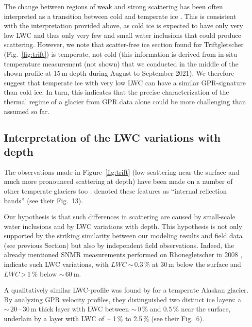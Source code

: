 The change between regions of weak and strong scattering has been often interpreted as a transition between cold and temperate ice \citep[e.g.][]{Moore&al1999,Blatter&Hutter1991,Bjornsson&el1996}. This is consistent with the interpretation provided above, as cold ice is expected to have only very low LWC and thus only very few and small water inclusions that could produce scattering. However, we note that scatter-free ice section found for Triftgletscher (Fig.~\ref{fig:trift}) is temperate, not cold (this information is derived from in-situ temperature measurement (not shown) that we conducted in the middle of the shown profile at 15\,m depth during August to September 2021). We therefore suggest that temperate ice with very low LWC can have a similar GPR-signature than cold ice. In turn, this indicates that the precise characterization of the thermal regime of a glacier from GPR data alone could be more challenging than assumed so far.  

\subsection{Interpretation of the LWC variations with depth}

The observations made in Figure~\ref{fig:trift} (low scattering near the surface and much more pronounced scattering at depth) have been made on a number of other temperate glaciers too \citep[see, e.g.,][and references therein]{Rutishauser&al2016}. \cite{Rutishauser&al2016} denoted these features as “internal reflection bands” (see their Fig.~13).

Our hypothesis is that such differences in scattering are caused by small-scale water inclusions and by LWC variations with depth. This hypothesis is not only supported by the striking similarity between our modeling results and field data (see previous Section) but also by independent field observations. Indeed, the already mentioned SNMR measurements performed on Rhonegletscher in 2008 \citep{Hertrich&Walbrecker2008}, indicate such LWC variations, with $LWC$\,$\sim$\,0.3\,\% at 30\,m below the surface and $LWC$\,>\,1\,\% below $\sim$\,60\,m. 

A qualitatively similar LWC-profile was found by \cite{Bradford&al2009} for a temperate Alaskan glacier. By analyzing GPR velocity profiles, they distinguished two distinct ice layers: a $\sim$\,20\,--\,30\,m thick layer with LWC between $\sim$\,0\,\% and 0.5\,\% near the surface, underlain by a layer with LWC of $\sim$\,1\,\% to 2.5\,\% (see their Fig.~6).


